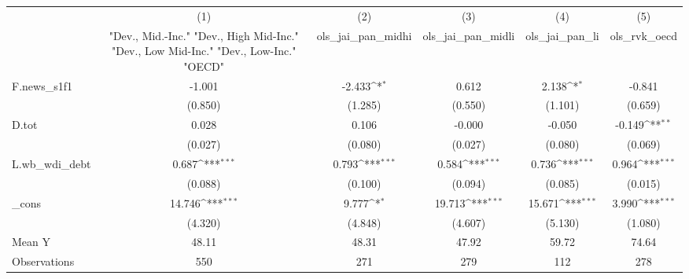 {
\def\sym#1{\ifmmode^{#1}\else\(^{#1}\)\fi}
\begin{tabular}{l*{5}{c}}
\toprule
            &\multicolumn{1}{c}{(1)}&\multicolumn{1}{c}{(2)}&\multicolumn{1}{c}{(3)}&\multicolumn{1}{c}{(4)}&\multicolumn{1}{c}{(5)}\\
            &\multicolumn{1}{c}{ "Dev., Mid.-Inc." "Dev., High Mid-Inc." "Dev., Low Mid-Inc." "Dev., Low-Inc." "OECD" }&\multicolumn{1}{c}{ols\_jai\_pan\_midhi}&\multicolumn{1}{c}{ols\_jai\_pan\_midli}&\multicolumn{1}{c}{ols\_jai\_pan\_li}&\multicolumn{1}{c}{ols\_rvk\_oecd}\\
\midrule
F.news\_s1f1 &      -1.001         &      -2.433\sym{*}  &       0.612         &       2.138\sym{*}  &      -0.841         \\
            &     (0.850)         &     (1.285)         &     (0.550)         &     (1.101)         &     (0.659)         \\
\addlinespace
D.tot       &       0.028         &       0.106         &      -0.000         &      -0.050         &      -0.149\sym{**} \\
            &     (0.027)         &     (0.080)         &     (0.027)         &     (0.080)         &     (0.069)         \\
\addlinespace
L.wb\_wdi\_debt&       0.687\sym{***}&       0.793\sym{***}&       0.584\sym{***}&       0.736\sym{***}&       0.964\sym{***}\\
            &     (0.088)         &     (0.100)         &     (0.094)         &     (0.085)         &     (0.015)         \\
\addlinespace
\_cons      &      14.746\sym{***}&       9.777\sym{*}  &      19.713\sym{***}&      15.671\sym{***}&       3.990\sym{***}\\
            &     (4.320)         &     (4.848)         &     (4.607)         &     (5.130)         &     (1.080)         \\
\midrule
Mean Y      &       48.11         &       48.31         &       47.92         &       59.72         &       74.64         \\
Observations&         550         &         271         &         279         &         112         &         278         \\
\bottomrule
\end{tabular}
}
